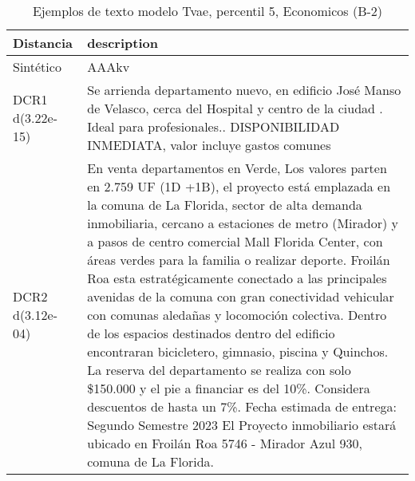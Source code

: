 \begin{table}[H]
\centering
\fontsize{10}{14}\selectfont
\caption{Ejemplos de texto modelo Tvae, percentil 5, Economicos (B-2)}
\label{table-example-economicos-b-2-tvae-5p-text}
\begin{tabular}{|l|m{35em}|}
\hline
\rowcolor[gray]{0.8}
Distancia & description \\
\hline Sintético & AAAkv \\
\hline DCR1 d(3.22e-15) & Se arrienda departamento nuevo, en edificio Jos\'e Manso de Velasco, cerca del Hospital y centro de la ciudad . Ideal para profesionales.. DISPONIBILIDAD INMEDIATA, valor incluye gastos comunes  \\
\hline DCR2 d(3.12e-04) & En venta departamentos en Verde, Los valores parten en 2.759 UF (1D +1B), el proyecto est\'a emplazada en la comuna de La Florida, sector de alta demanda inmobiliaria, cercano a estaciones de metro (Mirador) y a pasos de centro comercial Mall Florida Center, con \'areas verdes para la familia o realizar deporte. Froil\'an Roa esta estrat\'egicamente conectado a las principales avenidas de la comuna con gran conectividad vehicular con comunas aleda\~nas y locomoci\'on colectiva. Dentro de los espacios destinados dentro del edificio encontraran bicicletero, gimnasio, piscina y Quinchos.
La reserva del departamento se realiza con solo \$150.000 y el pie a financiar es del 10\%. Considera descuentos de hasta un 7\%.
Fecha estimada de entrega: Segundo Semestre 2023
El Proyecto inmobiliario estar\'a ubicado en Froil\'an Roa 5746 - Mirador Azul 930,  comuna de La Florida. \\
\hline
\end{tabular}
\end{table}
